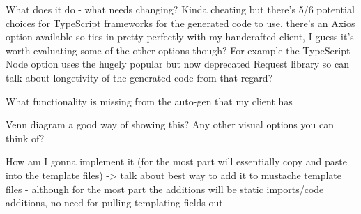 What does it do - what needs changing? Kinda cheating but there's 5/6 potential choices for TypeScript frameworks for the generated code to use, there's an Axios option available so ties in pretty perfectly with my handcrafted-client, I guess it's worth evaluating some of the other options though? For example the TypeScript-Node option uses the hugely popular but now deprecated Request library so can talk about longetivity of the generated code from that regard?

What functionality is missing from the auto-gen that my client has

Venn diagram a good way of showing this? Any other visual options you can think of?

How am I gonna implement it (for the most part will essentially copy and paste into the template files) -> talk about best way to add it to mustache template files - although for the most part the additions will be static imports/code additions, no need for pulling templating fields out